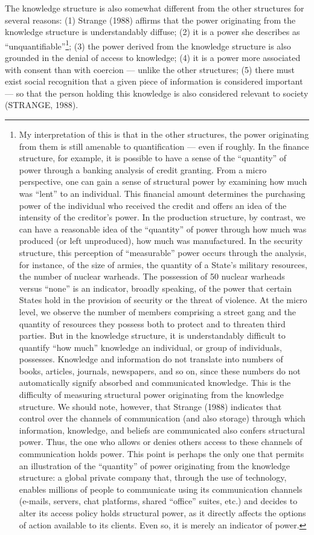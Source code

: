 The knowledge structure is also somewhat different from the other structures for several reasons: (1) Strange (1988) affirms that the power originating from the knowledge structure is understandably diffuse; (2) it is a power she describes as ``unquantifiable''\footnote{My interpretation of this is that in the other structures, the power originating from them is still amenable to quantification --- even if roughly. In the finance structure, for example, it is possible to have a sense of the ``quantity'' of power through a banking analysis of credit granting. From a micro perspective, one can gain a sense of structural power by examining how much was ``lent'' to an individual. This financial amount determines the purchasing power of the individual who received the credit and offers an idea of the intensity of the creditor's power. In the production structure, by contrast, we can have a reasonable idea of the ``quantity'' of power through how much was produced (or left unproduced), how much was manufactured. In the security structure, this perception of ``measurable'' power occurs through the analysis, for instance, of the size of armies, the quantity of a State's military resources, the number of nuclear warheads. The possession of 50 nuclear warheads versus ``none'' is an indicator, broadly speaking, of the power that certain States hold in the provision of security or the threat of violence. At the micro level, we observe the number of members comprising a street gang and the quantity of resources they possess both to protect and to threaten third parties. But in the knowledge structure, it is understandably difficult to quantify ``how much'' knowledge an individual, or group of individuals, possesses. Knowledge and information do not translate into numbers of books, articles, journals, newspapers, and so on, since these numbers do not automatically signify absorbed and communicated knowledge. This is the difficulty of measuring structural power originating from the knowledge structure. We should note, however, that Strange (1988) indicates that control over the channels of communication (and also storage) through which information, knowledge, and beliefs are communicated also confers structural power. Thus, the one who allows or denies others access to these channels of communication holds power. This point is perhaps the only one that permits an illustration of the ``quantity'' of power originating from the knowledge structure: a global private company that, through the use of technology, enables millions of people to communicate using its communication channels (e-mails, servers, chat platforms, shared ``office'' suites, etc.) and decides to alter its access policy holds structural power, as it directly affects the options of action available to its clients. Even so, it is merely an indicator of power.}; (3) the power derived from the knowledge structure is also grounded in the denial of access to knowledge; (4) it is a power more associated with consent than with coercion --- unlike the other structures; (5) there must exist social recognition that a given piece of information is considered important --- so that the person holding this knowledge is also considered relevant to society (STRANGE, 1988).

